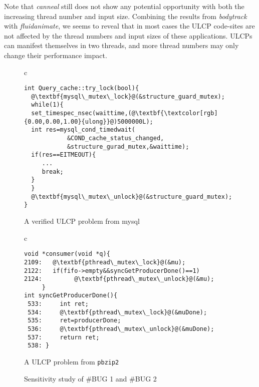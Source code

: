 Note that \emph{canneal} still does not show any potential opportunity with both the increasing thread number and input size. Combining the results from \emph{bodytrack} with \emph{fluidanimate}, we seems to reveal that in most cases the ULCP code-sites are not affected by the thread numbers and input sizes of these applications. ULCPs can manifest themselves in two threads, and more thread numbers may only change their performance impact.
\begin{figure}[t]
\centering
\begin{tabular}{c}
\begin{lstlisting}[escapechar=@,linewidth=8cm]
int Query_cache::try_lock(bool){
  @\textbf{mysql\_mutex\_lock}@(&structure_guard_mutex);
  while(1){
  set_timespec_nsec(waittime,(@\textbf{\textcolor[rgb]{0.00,0.00,1.00}{ulong}}@)5000000L);
  int res=mysql_cond_timedwait(
            &COND_cache_status_changed,
            &structure_gurad_mutex,&waittime);
  if(res==EITMEOUT){
     ...
     break;
  }
  }
  @\textbf{mysql\_mutex\_unlock}@(&structure_guard_mutex);
}
\end{lstlisting}
\end{tabular}
\caption{A verified ULCP problem from \textsf{mysql}}
\label{fig:official:case}
\end{figure}
\begin{figure}[t]
\centering
\begin{tabular}{c}
\begin{lstlisting}[escapechar=@,linewidth=8cm]
void *consumer(void *q){
2109:   @\textbf{pthread\_mutex\_lock}@(&mu);
2122:   if(fifo->empty&&syncGetProducerDone()==1)
2124:         @\textbf{pthread\_mutex\_unlock}@(&mu);
     }
int syncGetProducerDone(){
 533:     int ret;
 534:     @\textbf{pthread\_mutex\_lock}@(&muDone);
 535:     ret=producerDone;
 536:     @\textbf{pthread\_mutex\_unlock}@(&muDone);
 537:     return ret;
 538: }
\end{lstlisting}
\end{tabular}
\caption{A ULCP problem from \texttt{pbzip2}}
\label{fig:pbzip}
\end{figure}
\begin{figure}[htpb]
\centering
 \hfill
 \caption{Sensitivity study of \#BUG 1 and \#BUG 2}
 \label{fig:case:study}
\end{figure}


